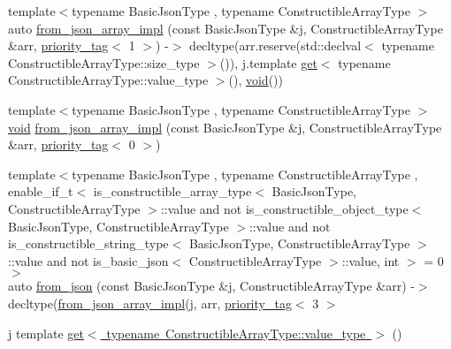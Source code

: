 \begin{DoxyCompactItemize}
\item 
{\footnotesize template$<$typename Basic\+Json\+Type , typename Constructible\+Array\+Type $>$ }\\auto \mbox{\hyperlink{namespacenlohmann_1_1detail_a464e1246f3df7edea79c3f81ab701edd}{from\+\_\+json\+\_\+array\+\_\+impl}} (const Basic\+Json\+Type \&j, Constructible\+Array\+Type \&arr, \mbox{\hyperlink{structnlohmann_1_1detail_1_1priority__tag}{priority\+\_\+tag}}$<$ 1 $>$) -\/$>$ decltype(arr.\+reserve(std\+::declval$<$ typename Constructible\+Array\+Type\+::size\+\_\+type $>$()), j.\+template \mbox{\hyperlink{namespacenlohmann_1_1detail_acc422c11342b31368f610b6f96fcedc6}{get}}$<$ typename Constructible\+Array\+Type\+::value\+\_\+type $>$(), \mbox{\hyperlink{namespacenlohmann_1_1detail_a59fca69799f6b9e366710cb9043aa77d}{void}}())
\item 
{\footnotesize template$<$typename Basic\+Json\+Type , typename Constructible\+Array\+Type $>$ }\\\mbox{\hyperlink{namespacenlohmann_1_1detail_a59fca69799f6b9e366710cb9043aa77d}{void}} \mbox{\hyperlink{namespacenlohmann_1_1detail_a20cf21255e75cff1ffb0869c2c545e63}{from\+\_\+json\+\_\+array\+\_\+impl}} (const Basic\+Json\+Type \&j, Constructible\+Array\+Type \&arr, \mbox{\hyperlink{structnlohmann_1_1detail_1_1priority__tag}{priority\+\_\+tag}}$<$ 0 $>$)
\item 
{\footnotesize template$<$typename Basic\+Json\+Type , typename Constructible\+Array\+Type , enable\+\_\+if\+\_\+t$<$ is\+\_\+constructible\+\_\+array\+\_\+type$<$ Basic\+Json\+Type, Constructible\+Array\+Type $>$\+::value and not is\+\_\+constructible\+\_\+object\+\_\+type$<$ Basic\+Json\+Type, Constructible\+Array\+Type $>$\+::value and not is\+\_\+constructible\+\_\+string\+\_\+type$<$ Basic\+Json\+Type, Constructible\+Array\+Type $>$\+::value and not is\+\_\+basic\+\_\+json$<$ Constructible\+Array\+Type $>$\+::value, int $>$  = 0$>$ }\\auto \mbox{\hyperlink{namespacenlohmann_1_1detail_a14d8cdf544585f1c38eab6a0820e55f7}{from\+\_\+json}} (const Basic\+Json\+Type \&j, Constructible\+Array\+Type \&arr) -\/$>$ decltype(\mbox{\hyperlink{namespacenlohmann_1_1detail_a40f7bb070a60e8ba14fffb9c117fcbd8}{from\+\_\+json\+\_\+array\+\_\+impl}}(j, arr, \mbox{\hyperlink{structnlohmann_1_1detail_1_1priority__tag}{priority\+\_\+tag}}$<$ 3 $>$
\item 
j template \mbox{\hyperlink{namespacenlohmann_1_1detail_ad9e016d7b6a3cd2847027950aa0aac3b}{get$<$ typename Constructible\+Array\+Type\+::value\+\_\+type $>$}} ()

\end{DoxyCompactItemize}
